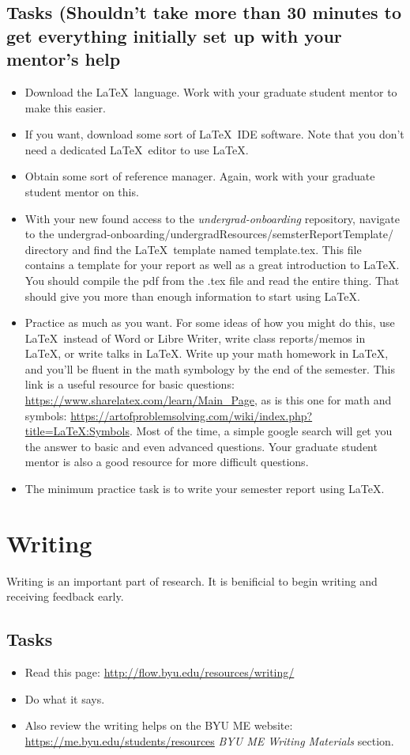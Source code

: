 \documentclass[]{article}%
\begin{document}
\subsection{Tasks (Shouldn't take more than 30 minutes to get everything initially set up with your mentor's help}
\begin{itemize}
	\item Download the \LaTeX~language.  Work with your graduate student mentor to make this easier. 
	\item If you want, download some sort of \LaTeX~IDE software. Note that you don't need a dedicated \LaTeX~editor to use \LaTeX. 
	\item Obtain some sort of reference manager. Again, work with your graduate student mentor on this.
	\item With your new found access to the  \textit{undergrad-onboarding} repository, navigate to the undergrad-onboarding/undergradResources/semsterReportTemplate/ directory and find the \LaTeX~template named template.tex.  This file contains a template for your report as well as a great introduction to \LaTeX.  You should compile the pdf from the .tex file and read the entire thing.  That should give you more than enough information to start using \LaTeX.
	\item Practice as much as you want. For some ideas of how you might do this, use \LaTeX~instead of Word or Libre Writer, write class reports/memos in \LaTeX, or write talks in \LaTeX. Write up your math homework in \LaTeX, and you'll be fluent in the math symbology by the end of the semester. This link is a useful resource for basic questions: \url{https://www.sharelatex.com/learn/Main_Page}, as is this one for math and symbols: \url{https://artofproblemsolving.com/wiki/index.php?title=LaTeX:Symbols}.  Most of the time, a simple google search will get you the answer to basic and even advanced questions. Your graduate student mentor is also a good resource for more difficult questions.
	\item The minimum practice task is to write your semester report using \LaTeX.
\end{itemize}


\section{Writing}
Writing is an important part of research.  It is benificial to begin writing and receiving feedback early.  

\subsection{Tasks}
\begin{itemize}
	\item Read this page: \url{http://flow.byu.edu/resources/writing/}
	\item Do what it says.
	\item Also review the writing helps on the BYU ME website: \url{https://me.byu.edu/students/resources} \textit{BYU ME Writing Materials} section.
\end{itemize}
\end{document}
